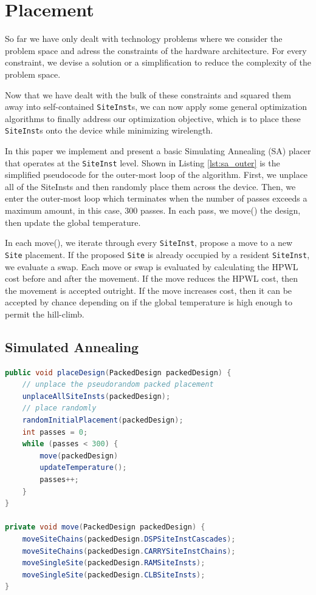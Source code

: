 
\section{Placement}
\label{sec:placement}
So far we have only dealt with technology problems where we consider the problem space and adress the constraints of the hardware architecture. 
For every constraint, we devise a solution or a simplification to reduce the complexity of the problem space. 

Now that we have dealt with the bulk of these constraints and squared them away into self-contained \texttt{SiteInst}s, we can now apply some general optimization algorithms to finally address our optimization objective, which is to place these \texttt{SiteInst}s onto the device while minimizing wirelength. 

In this paper we implement and present a basic Simulating Annealing (SA) placer that operates at the \texttt{SiteInst} level. 
Shown in Listing \ref{lst:sa_outer} is the simplified pseudocode for the outer-most loop of the algorithm. 
First, we unplace all of the SiteInsts and then randomly place them across the device.
Then, we enter the outer-most loop which terminates when the number of passes exceeds a maximum amount, in this case, 300 passes. 
In each pass, we move() the design, then update the global temperature. 

In each move(), we iterate through every \texttt{SiteInst}, propose a move to a new \texttt{Site} placement. 
If the proposed \texttt{Site} is already occupied by a resident \texttt{SiteInst}, we evaluate a swap. 
Each move or swap is evaluated by calculating the HPWL cost before and after the movement.
If the move reduces the HPWL cost, then the movement is accepted outright.
If the move increases cost, then it can be accepted by chance depending on if the global temperature is high enough to permit the hill-climb.



\subsection{Simulated Annealing}
\label{subsec:simulated_annealing}

\begin{lstlisting}[language=java, caption={SA pseudocode: outer loop}, label={lst:sa_outer}]
public void placeDesign(PackedDesign packedDesign) {
    // unplace the pseudorandom packed placement
    unplaceAllSiteInsts(packedDesign);
    // place randomly
    randomInitialPlacement(packedDesign);
    int passes = 0;
    while (passes < 300) {
        move(packedDesign)
        updateTemperature();
        passes++;
    }
}

private void move(PackedDesign packedDesign) {
    moveSiteChains(packedDesign.DSPSiteInstCascades);
    moveSiteChains(packedDesign.CARRYSiteInstChains);
    moveSingleSite(packedDesign.RAMSiteInsts);
    moveSingleSite(packedDesign.CLBSiteInsts);
}
\end{lstlisting}

